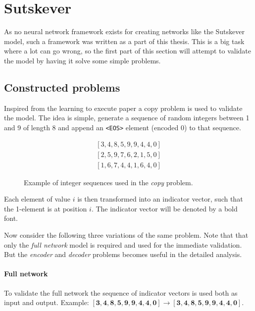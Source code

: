 \section{Sutskever}

As no neural network framework exists for creating networks like the Sutskever model, such a framework was written as a part of this thesis. This is a big task where a lot can go wrong, so the first part of this section will attempt to validate the model by having it solve some simple problems.

\subsection{Constructed problems}

Inspired from the learning to execute paper \cite{learning-to-execute} a copy problem is used to validate the model. The idea is simple, generate a sequence of random integers between 1 and 9 of length 8 and append an \texttt{<EOS>} element (encoded 0) to that sequence. 
\begin{figure}[H]
\begin{equation*}
\begin{aligned}
[3, 4, 8, 5, 9, 9, 4, 4, 0] \\
[2, 5, 9, 7, 6, 2, 1, 5, 0] \\
[1, 6, 7, 4, 4, 1, 6, 4, 0]
\end{aligned}
\end{equation*}
\caption{Example of integer sequences used in the \textit{copy} problem.}
\end{figure}

Each element of value $i$ is then transformed into an indicator vector, such that the 1-element is at position $i$. The indicator vector will be denoted by a bold font.

Now consider the following three variations of the same problem. Note that that only the \textit{full network} model is required and used for the immediate validation. But the \textit{encoder} and \textit{decoder} problems becomes useful in the detailed analysis.

\paragraph{Full network} To validate the full network the sequence of indicator vectors is used both as input and output. Example: $[\mathbf{3}, \mathbf{4}, \mathbf{8}, \mathbf{5}, \mathbf{9}, \mathbf{9}, \mathbf{4}, \mathbf{4}, \mathbf{0}] \rightarrow [\mathbf{3}, \mathbf{4}, \mathbf{8}, \mathbf{5}, \mathbf{9}, \mathbf{9}, \mathbf{4}, \mathbf{4}, \mathbf{0}]$.

